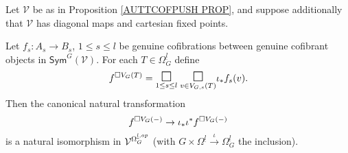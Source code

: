 \documentclass[a4paper,10pt]{article}%
\begin{document}
\begin{remark}
\end{remark}


\begin{proposition}\label{FIXPT PROP}
	Let $\mathcal{V}$ be as in Proposition \ref{AUTTCOFPUSH PROP}, and suppose additionally that 
	$\mathcal{V}$ has diagonal maps and cartesian fixed points.

	Let  
	$f_s \colon A_s \to B_s$, $1\leq s \leq l$ be 
	genuine cofibrations between genuine cofibrant objects in 
	$\mathsf{Sym}^G(\mathcal{V})$.
	For each $T \in \Omega_{G}^{\underline{l}}$ define
\[
		f^{\square V_G(T)} = 
		\underset{1\leq s \leq l}{\mathlarger{\mathlarger{\square}}}
			\phantom{!}
		\underset{v \in V_{G,s}(T)}{\mathlarger{\mathlarger{\square}}}
		\iota_{\**}f_s(v).
\]
	Then the canonical natural transformation
	\begin{equation}\label{FIXEDPOINT1 EQ}
		f^{\square V_G(-)} \to
		\iota_{\**} \iota^{\**} f^{\square V_G(-)}
	\end{equation}
		is a natural isomorphism in $\mathcal V^{\Omega_G^{\underline{l},op}}$ (with $G \times \Omega^{\underline{l}} \xrightarrow{\iota} \Omega_G^{\underline{l}}$ the inclusion).
\end{proposition}
\end{document}
